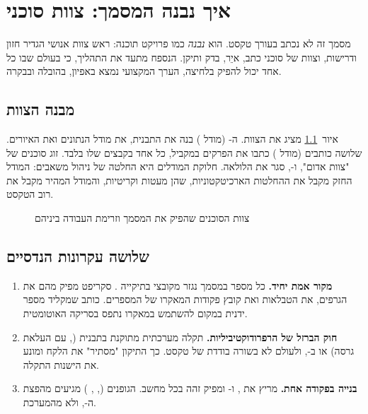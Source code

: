 \chapter{איך נבנה המסמך: צוות סוכני }\label{ch:how-built}

מסמך זה לא נכתב בעורך טקסט. הוא \emph{נבנה} כמו פרויקט תוכנה: ראש צוות אנושי הגדיר חזון ודרישות, וצוות של סוכני  כתב, איֵר, בדק ותיקן. הנספח מתעד את התהליך, כי בעולם שבו כל אחד יכול להפיק  בלחיצה, הערך המקצועי נמצא באפיון, בהובלה ובבקרה.

\section{מבנה הצוות}

איור~\ref{fig:agents} מציג את הצוות. ה- (מודל ) בנה את התבנית, את מודל הנתונים ואת האיורים. שלושה כותבים (מודל ) כתבו את הפרקים במקביל, כל אחד בקבצים שלו בלבד. זוג סוכנים של "צוות אדום",  ו-, סגר את הלולאה. חלוקת המודלים היא החלטה של ניהול משאבים: המודל החזק מקבל את ההחלטות הארכיטקטוניות, שהן מעטות וקריטיות, והמודל המהיר מקבל את רוב הטקסט.

\begin{figure}[htbp]
  \centering
  \resizebox{0.86\linewidth}{!}{}
  \caption{צוות הסוכנים שהפיק את המסמך וזרימת העבודה ביניהם}
  \label{fig:agents}
\end{figure}

\section{שלושה עקרונות הנדסיים}

\begin{enumerate}
  \item \textbf{מקור אמת יחיד.} כל מספר במסמך נגזר מקובצי  בתיקייה . סקריפט  מפיק מהם את הגרפים, את הטבלאות ואת קובץ פקודות המאקרו של המספרים. כותב שמקליד מספר ידנית במקום להשתמש במאקרו נתפס בסריקה האוטומטית.
  \item \textbf{חוק הברזל של הרפרודוקטיביליות.} תקלה מערכתית מתוקנת בתבנית (, עם העלאת גרסה) או ב-, ולעולם לא בשורה בודדת של טקסט. כך התיקון "מסתיר" את הלקח ומונע את הישנות התקלה.
  \item \textbf{בנייה בפקודה אחת.}  מריץ את ,  ו- ומפיק  זהה בכל מחשב. הגופנים (, , ) מגיעים מהפצת ה-, ולא מהמערכת.
\end{enumerate}

